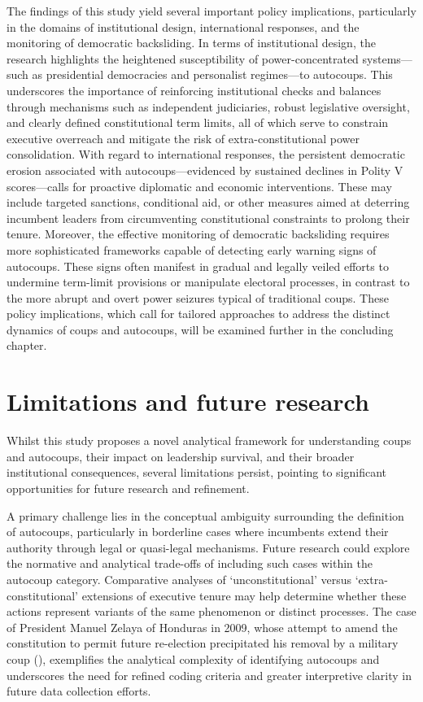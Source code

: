 \documentclass[
  12pt,
]{report}
\begin{document}
The findings of this study yield several important policy implications,
particularly in the domains of institutional design, international
responses, and the monitoring of democratic backsliding. In terms of
institutional design, the research highlights the heightened
susceptibility of power-concentrated systems---such as presidential
democracies and personalist regimes---to autocoups. This underscores the
importance of reinforcing institutional checks and balances through
mechanisms such as independent judiciaries, robust legislative
oversight, and clearly defined constitutional term limits, all of which
serve to constrain executive overreach and mitigate the risk of
extra-constitutional power consolidation. With regard to international
responses, the persistent democratic erosion associated with
autocoups---evidenced by sustained declines in Polity V scores---calls
for proactive diplomatic and economic interventions. These may include
targeted sanctions, conditional aid, or other measures aimed at
deterring incumbent leaders from circumventing constitutional
constraints to prolong their tenure. Moreover, the effective monitoring
of democratic backsliding requires more sophisticated frameworks capable
of detecting early warning signs of autocoups. These signs often
manifest in gradual and legally veiled efforts to undermine term-limit
provisions or manipulate electoral processes, in contrast to the more
abrupt and overt power seizures typical of traditional coups. These
policy implications, which call for tailored approaches to address the
distinct dynamics of coups and autocoups, will be examined further in
the concluding chapter.

\section{Limitations and future
research}\label{limitations-and-future-research}

Whilst this study proposes a novel analytical framework for
understanding coups and autocoups, their impact on leadership survival,
and their broader institutional consequences, several limitations
persist, pointing to significant opportunities for future research and
refinement.

A primary challenge lies in the conceptual ambiguity surrounding the
definition of autocoups, particularly in borderline cases where
incumbents extend their authority through legal or quasi-legal
mechanisms. Future research could explore the normative and analytical
trade-offs of including such cases within the autocoup category.
Comparative analyses of `unconstitutional' versus `extra-constitutional'
extensions of executive tenure may help determine whether these actions
represent variants of the same phenomenon or distinct processes. The
case of President Manuel Zelaya of Honduras in 2009, whose attempt to
amend the constitution to permit future re-election precipitated his
removal by a military coup
(), exemplifies the analytical complexity of identifying autocoups
and underscores the need for refined coding criteria and greater
interpretive clarity in future data collection efforts.
\end{document}
